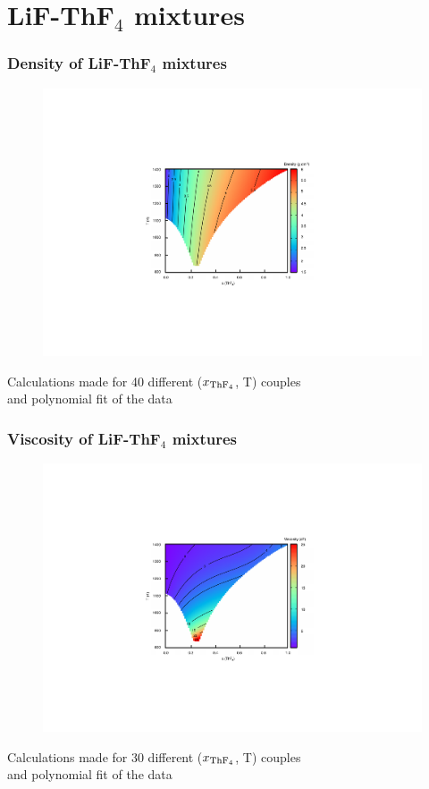 \documentclass{beamer}
\begin{document}


\section{LiF-ThF$_4$ mixtures}

\begin{frame}
   \frametitle{Density of LiF-ThF$_4$ mixtures}
   \begin{figure}
   \includegraphics[width=.6\textwidth]{density}
   \end{figure}

   Calculations made for 40 different ($x_{\rm ThF_4}$, T) couples\\ and polynomial fit of the data
   
\end{frame}

\begin{frame}
   \frametitle{Viscosity of LiF-ThF$_4$ mixtures}
   \begin{figure}
   \includegraphics[width=.6\textwidth]{viscosity}
   \end{figure}

   Calculations made for 30 different ($x_{\rm ThF_4}$, T) couples\\ and polynomial fit of the data
   
\end{frame}
\end{document}
